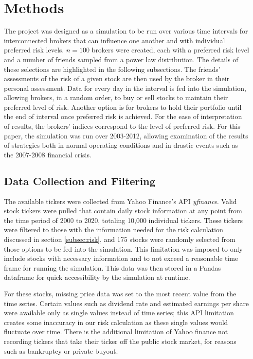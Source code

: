 \documentclass[letterpaper, 11 pt, proceedings]{IEEEtran}
\begin{document}
	\section{Methods}\label{sec:methods}
	The project was designed as a simulation to be run over various time intervals for interconnected brokers that can influence one another and with individual preferred risk levels. $n=100$ brokers were created, each with a preferred risk level and a number of friends sampled from a power law distribution. The details of these selections are highlighted in the following subsections. The friends' assessments of the risk of a given stock are then used by the broker in their personal assessment. Data for every day in the interval is fed into the simulation, allowing brokers, in a random order, to buy or sell stocks to maintain their preferred level of risk. Another option is for brokers to hold their portfolio until the end of interval once preferred risk is achieved. For the ease of interpretation of results, the brokers' indices correspond to the level of preferred risk. For this paper, the simulation was run over 2003-2012, allowing examination of the results of strategies both in normal operating conditions and in drastic events such as the 2007-2008 financial crisis.
	
	\subsection{Data Collection and Filtering}\label{subsec:data}
	The available tickers were collected from Yahoo Finance's API \textit{yfinance}. Valid stock tickers were pulled that contain daily stock information at any point from the time period of 2000 to 2020, totaling 10,000 individual tickers. These tickers were filtered to those with the information needed for the risk calculation discussed in section \ref{subsec:risk}, and 175 stocks were randomly selected from those options to be fed into the simulation. This limitation was imposed to only include stocks with necessary information and to not exceed a reasonable time frame for running the simulation. This data was then stored in a Pandas dataframe for quick accessibility by the simulation at runtime.
	
	For these stocks, missing price data was set to the most recent value from the time series. Certain values such as dividend rate and estimated earnings per share were available only as single values instead of time series; this API limitation creates some inaccuracy in our risk calculation as these single values would fluctuate over time. There is the additional limitation of Yahoo finance not recording tickers that take their ticker off the public stock market, for reasons such as bankruptcy or private buyout.
	
\end{document}
